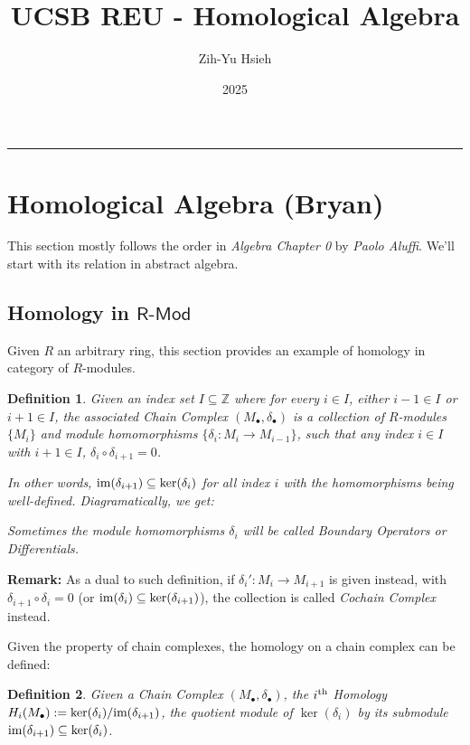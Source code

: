 \documentclass[x11names,reqno,12pt]{extarticle}
\title{UCSB REU - Homological Algebra}
\author{Zih-Yu Hsieh}
\date{2025}
\newtheorem{defn}{Definition}
\newcommand{\cat}[1]{\textsf{#1}}
\begin{document}
\maketitle
\hrule
\vspace{1em}
\renewcommand{\tilde}{\widetilde}
\section*{Homological Algebra (Bryan)}
This section mostly follows the order in \emph{Algebra Chapter 0} by \emph{Paolo Aluffi}. We'll start with its relation in abstract algebra.
\subsection*{Homology in $\cat{R-Mod}$}
Given $R$ an arbitrary ring, this section provides an example of homology in category of $R$-modules.

\begin{defn}
    Given an index set $I \subseteq \mathbb{Z}$ where for every $i\in I$, either $i-1\in I$ or $i+1\in I$, the associated \emph{Chain Complex} $(M_\bullet, \delta_\bullet)$ is a collection of $R$-modules $\{M_i\}$ and module homomorphisms $\{\delta_i:M_i\rightarrow M_{i-1}\}$, such that any index $i\in I$ with $i+1\in I$, $\delta_i\circ \delta_{i+1}=0$.

    In other words, $\textmd{im}(\delta_{i+1})\subseteq \ker(\delta_i)$ for all index $i$ with the homomorphisms being well-defined. Diagramatically, we get:
    \begin{center}
    \end{center}
    Sometimes the module homomorphisms $\delta_i$ will be called \textmd{Boundary Operators} or \textmd{Differentials}.
\end{defn}
\textbf{Remark:} As a dual to such definition, if $\delta_i':M_i\rightarrow M_{i+1}$ is given instead, with $\delta_{i+1}\circ \delta_i=0$ (or $\textmd{im}(\delta_{i})\subseteq \ker(\delta_{i+1})$), the collection is called \emph{Cochain Complex} instead.

\hfill

Given the property of chain complexes, the homology on a chain complex can be defined:
\begin{defn}
    Given a Chain Complex $(M_\bullet, \delta_\bullet)$, the \emph{$i^\textmd{th}$ Homology} $H_i(M_\bullet) := \ker(\delta_i)/\textmd{im}(\delta_{i+1})$, the quotient module of $\ker(\delta_i)$ by its submodule $\textmd{im}(\delta_{i+1})\subseteq \ker(\delta_i)$.
\end{defn}
\end{document}
